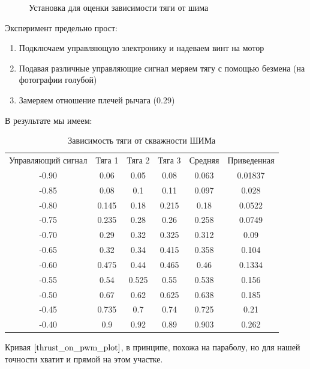 \documentclass[12pt,a4paper]{article}
\begin{document}
\begin{figure}[h]
	\caption{Установка для оценки зависимости тяги от шима}
\end{figure}

Эксперимент предельно прост:

\begin{enumerate}
	\item Подключаем управляющую электронику и надеваем винт на мотор
	\item Подавая различные управляющие сигнал меряем тягу с помощью безмена (на фотографии голубой)
	\item Замеряем отношение плечей рычага (0.29)
\end{enumerate}

В результате мы имеем:

\begin{table}[h]
	\caption{Зависимость тяги от скважности ШИМа}
	\label{thrust_on_pwm_data}
	\begin{center}
		\begin{tabular}{cccccc}
			Управляющий сигнал &  Тяга 1 & Тяга 2 & Тяга 3 & Средняя & Приведенная \\
			-0.90 & 0.06 & 0.05 & 0.08 & 0.063 & 0.01837 \\
			-0.85 & 0.08 & 0.1 & 0.11 & 0.097 & 0.028 \\
			-0.80 & 0.145 & 0.18 & 0.215 & 0.18 & 0.0522 \\
			-0.75 & 0.235 & 0.28 & 0.26 & 0.258 & 0.0749 \\
			-0.70 & 0.29 & 0.32 & 0.325 & 0.312 & 0.09 \\
			-0.65 & 0.32 & 0.34 & 0.415 & 0.358 & 0.104 \\
			-0.60 & 0.475 & 0.44 & 0.465 & 0.46 & 0.1334 \\
			-0.55 & 0.54 & 0.525 & 0.55 & 0.538 & 0.156 \\
			-0.50 & 0.67 & 0.62 & 0.625 & 0.638 & 0.185 \\
			-0.45 & 0.735 & 0.7 & 0.74 & 0.725 & 0.21 \\
			-0.40 & 0.9 & 0.92 & 0.89 & 0.903 & 0.262 \\
		\end{tabular}
	\end{center}
\end{table}

Кривая $\ref{thrust_on_pwm_plot}$, в принципе, похожа на параболу, но для нашей точности хватит и прямой на этом участке.
\end{document}
